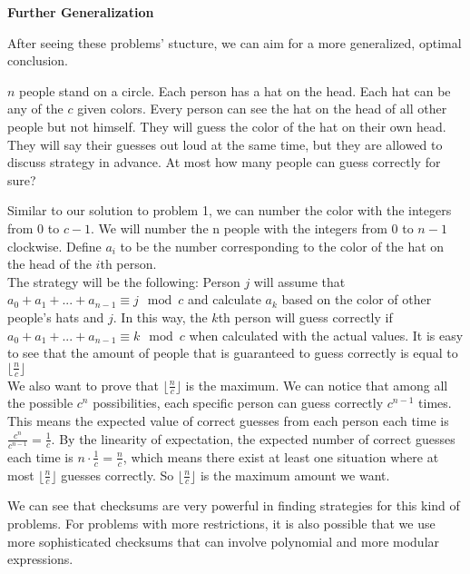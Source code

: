 \noindent	
\textbf{Further Generalization}

	After seeing these problems' stucture, we can aim for a more generalized, optimal conclusion.
	\begin{problem}
		$n$ people stand on a circle. Each person has a hat on the head. Each hat can be any of the $c$ given colors. Every person can see the hat on the head of all other people but not himself. They will guess the color of the hat on their own head. They will say their guesses out loud at the same time, but they are allowed to discuss strategy in advance. At most how many people can guess correctly for sure?
	\end{problem}
	\begin{solution}
		Similar to our solution to problem 1, we can number the color with the integers from 0 to $c-1$. We will number the n people with the integers from 0 to $n-1$ clockwise. Define $a_i$  to be the number corresponding to the color of the hat on the head of the $i$th person. \\
		The strategy will be the following: Person $j$ will assume that $a_0+a_1+...+a_{n-1} \equiv j \mod c$ and calculate $a_k$ based on the color of other people's hats and $j$. In this way, the $k$th person will guess correctly if $a_0+a_1+...+a_{n-1} \equiv k \mod c$ when calculated with the actual values. It is easy to see that the amount of people that is guaranteed to guess correctly is equal to $\lfloor \frac{n}{c} \rfloor$\\
		We also want to prove that $\lfloor \frac{n}{c} \rfloor$ is the maximum. We can notice that among all the possible $c^n$ possibilities, each specific person can guess correctly $c^{n-1}$ times. This means the expected value of correct guesses from each person each time is $\frac{c^n}{c^{n-1}} = \frac{1}{c}$. By the linearity of expectation, the expected number of correct guesses each time is $n \cdot \frac{1}{c} = \frac{n}{c}$, which means there exist at least one situation where at most $\lfloor \frac{n}{c} \rfloor$ guesses correctly. So $\lfloor \frac{n}{c} \rfloor$ is the maximum amount we want.
	\end{solution}
	\indent We can see that checksums are very powerful in finding strategies for this kind of problems. For problems with more restrictions, it is also possible that we use more sophisticated checksums that can involve polynomial and more modular expressions.
